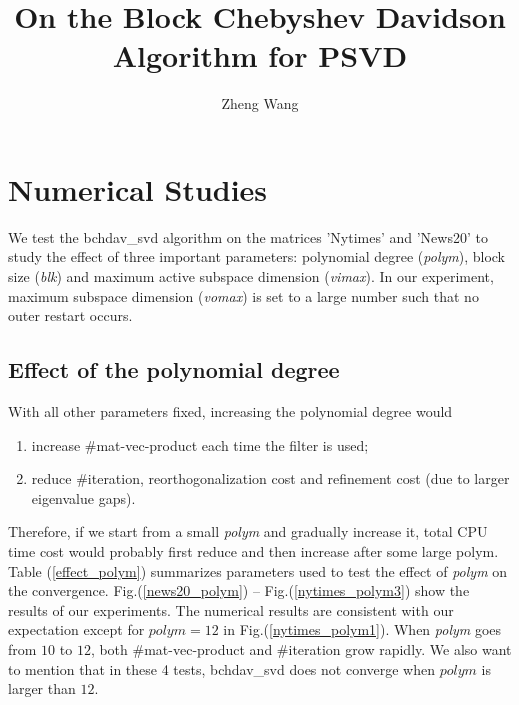 \documentclass[11pt]{article}
\numberwithin{equation}{section}
\numberwithin{figure}{section}
\numberwithin{table}{section}
\begin{document}
\title{On the Block Chebyshev Davidson Algorithm for PSVD}

\author{Zheng Wang}

\maketitle


\section{Numerical Studies}
\label{num_study}

We test the bchdav\_svd algorithm on the matrices 'Nytimes' and 'News20' to study the effect of three important parameters: polynomial degree (\textit{polym}), block size (\textit{blk}) and maximum active subspace dimension (\textit{vimax}). In our experiment, maximum subspace dimension (\textit{vomax}) is set to a large number such that no outer restart occurs.

\subsection{Effect of the polynomial degree}

With all other parameters fixed, increasing the polynomial degree would
\begin{enumerate}
\item increase \#mat-vec-product each time the filter is used;
\item reduce \#iteration, reorthogonalization cost and refinement cost (due to larger eigenvalue gaps).
\end{enumerate}
Therefore, if we start from a small \textit{polym} and gradually increase it, total CPU time cost would probably first reduce and then increase after some large polym.\\

Table (\ref{effect_polym}) summarizes parameters used to test the effect of \textit{polym} on the convergence. Fig.(\ref{news20_polym}) -- Fig.(\ref{nytimes_polym3}) show the results of our experiments. The numerical results are consistent with our expectation except for $polym = 12$ in Fig.(\ref{nytimes_polym1}). When \textit{polym} goes from $10$ to $12$, both \#mat-vec-product and \#iteration grow rapidly. We also want to mention that in these 4 tests, bchdav\_svd does not converge when $polym$ is larger than $12$.
\end{document}
